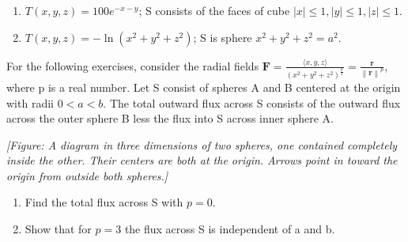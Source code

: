 \documentclass{exercises}
\begin{document}
\begin{enumerate}[resume]
\item $T(x,y,z)=100e^{-x-y}$; S consists of the faces of cube $|x|\le1,|y|\le1,|z|\le1$.
\item $T(x,y,z)=-\ln(x^{2}+y^{2}+z^{2})$; S is sphere $x^{2}+y^{2}+z^{2}=a^{2}$.
\end{enumerate}

For the following exercises, consider the radial fields $\mathbf{F}=\frac{\langle x,y,z\rangle}{{(x^{2}+y^{2}+z^{2})}^{\frac{p}{2}}}=\frac{\mathbf{r}}{\left\| \mathbf{r} \right\|^{p}}$, where p is a real number. Let S consist of spheres A and B centered at the origin with radii $0<a<b$. The total outward flux across S consists of the outward flux across the outer sphere B less the flux into S across inner sphere A.


\textit{[Figure: A diagram in three dimensions of two spheres, one contained completely inside the other. Their centers are both at the origin. Arrows point in toward the origin from outside both spheres.]}

\begin{enumerate}[resume]
\item Find the total flux across S with $p=0$.
\item Show that for $p=3$ the flux across S is independent of a and b.
\end{enumerate}
\end{document}
